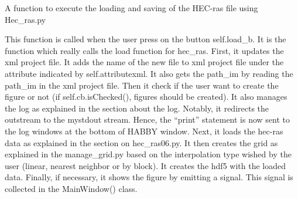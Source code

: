 \documentclass[letterpaper,10pt,english]{sphinxmanual}
\begin{document}
\begin{fulllineitems}
\begin{fulllineitems}
\end{fulllineitems}


\begin{fulllineitems}
\label{\detokenize{index:src_GUI.hydro_GUI_2.HEC_RAS1D.load_hec_ras_gui}}
A function to execute the loading and saving of the HEC-ras file using Hec\_ras.py


This function is called when the user press on the button self.load\_b. It is the function which really
calls the load function for hec\_ras. First, it updates the xml project file. It adds the name of the new file
to xml project file under the attribute indicated by self.attributexml. It also gets the path\_im by reading the
path\_im in the xml project file. Then it check if the user want to create the figure or not
(if self.cb.isChecked(), figures should be created). It also manages the log as explained in the section
about the log. Notably, it redirects the  outstream to the mystdout stream. Hence, the “print” statement is
now sent to the log windows at the bottom of HABBY window. Next, it loads the hec-ras data as explained in
the section on hec\_ras06.py. It then creates the grid as explained in the manage\_grid.py based on the
interpolation type wished by the user (linear, nearest neighbor or by block). It creates the hdf5
with the loaded data. Finally, if necessary, it shows the figure by emitting a signal.
This signal is collected in the MainWindow() class.

\end{fulllineitems}


\end{fulllineitems}

\end{document}

